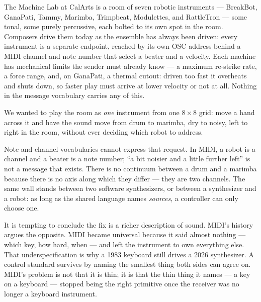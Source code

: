 
The Machine Lab at CalArts is a room of seven robotic instruments ---
BreakBot, GanaPati, Tammy, Marimba, Trimpbeat, Modulettes, and
RattleTron --- some tonal, some purely percussive, each bolted to its
own spot in the room. Composers drive them today as the ensemble has
always been driven: every instrument is a separate endpoint, reached
by its own OSC address behind a MIDI channel and note number that
select a beater and a velocity. Each machine has mechanical limits the
sender must already know --- a maximum re-strike rate, a force range,
and, on GanaPati, a thermal cutout: driven too fast it overheats and
shuts down, so faster play must arrive at lower velocity or not at
all. Nothing in the message vocabulary carries any of this.

We wanted to play the room as \emph{one} instrument from one $8\times8$
grid: move a hand across it and have the sound move from drum to
marimba, dry to noisy, left to right in the room, without ever
deciding which robot to address.

Note and channel vocabularies cannot express that request. In MIDI, a
robot is a channel and a beater is a note number; ``a bit noisier and
a little further left'' is not a message that exists. There is no
continuum between a drum and a marimba because there is no axis along
which they differ --- they are two channels. The same wall stands
between two software synthesizers, or between a synthesizer and a
robot: as long as the shared language names \emph{sources}, a
controller can only choose one.

It is tempting to conclude the fix is a richer description of sound.
MIDI's history argues the opposite. MIDI became universal because it
said almost nothing --- which key, how hard, when --- and left the
instrument to own everything else. That underspecification is why a
1983 keyboard still drives a 2026 synthesizer. A control standard
survives by naming the smallest thing both sides can agree on. MIDI's
problem is not that it is thin; it is that the thin thing it names ---
a key on a keyboard --- stopped being the right primitive once the
receiver was no longer a keyboard instrument.

